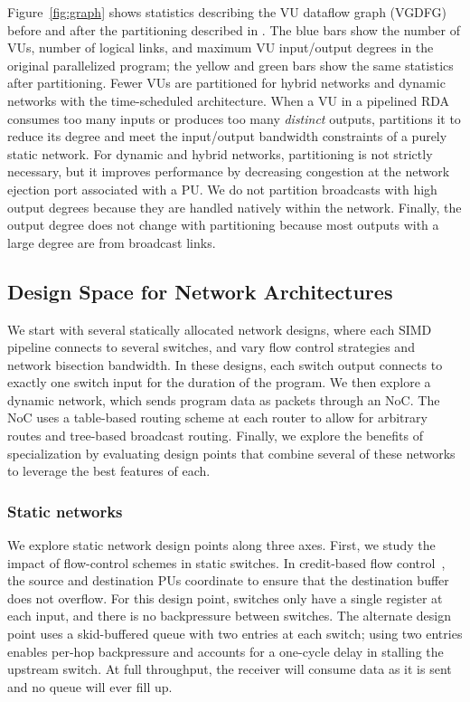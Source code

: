 Figure~\ref{fig:graph} shows statistics describing the VU dataflow graph (VGDFG) before and after
the partitioning described in . 
The blue bars show the number of VUs, number of logical links, and maximum VU input/output degrees in the original parallelized program; the yellow and green bars show the same statistics after partitioning. 
Fewer VUs are partitioned for hybrid networks and dynamic networks with the time-scheduled
architecture.
When a VU in a pipelined RDA consumes too many inputs or produces too many \emph{distinct} outputs,
\name partitions it to reduce its degree and meet the input/output bandwidth constraints of a purely static network. 
For dynamic and hybrid networks, partitioning is not strictly necessary, but it improves performance
by decreasing congestion at the network ejection port associated with a PU.
We do not partition broadcasts with high output degrees because they are handled natively within the network. 
Finally, the output degree does not change with partitioning because most outputs with a large degree are from broadcast links.

\subsection{Design Space for Network Architectures} \label{sec:networkds}

We start with several statically allocated network designs, where each SIMD pipeline connects to several switches, and vary flow control strategies and network bisection bandwidth.
In these designs, each switch output connects to exactly one switch input for the duration of the program.
We then explore a dynamic network, which sends program data as packets through an NoC.
The NoC uses a table-based routing scheme at each router to allow for arbitrary routes and tree-based broadcast routing.
Finally, we explore the benefits of specialization by evaluating design points that combine several of these networks to leverage the best features of each.

\subsubsection{Static networks}
We explore static network design points along three axes. 
First, we study the impact of flow-control schemes in static switches. 
In credit-based flow control~\cite{wang2013avoiding}, the source and destination PUs coordinate to ensure that the destination buffer does not overflow.
For this design point, switches only have a single register at each input, and there is no backpressure between switches.
The alternate design point uses a skid-buffered queue with two entries at each switch; using two entries enables per-hop backpressure and accounts for a one-cycle delay in stalling the upstream switch.
At full throughput, the receiver will consume data as it is sent and no queue will ever fill up.

